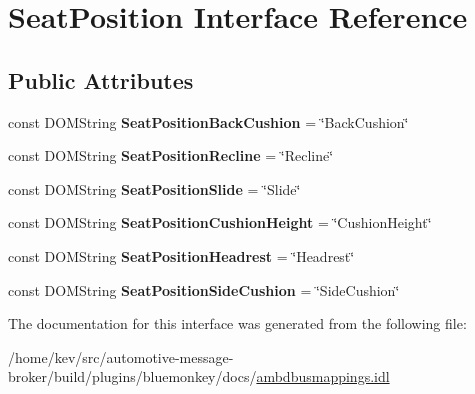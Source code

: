 \hypertarget{interfaceSeatPosition}{\section{Seat\+Position Interface Reference}
\label{interfaceSeatPosition}
}
\subsection*{Public Attributes}
\begin{DoxyCompactItemize}
\item 
\hypertarget{interfaceSeatPosition_ac8bece8802214d0e6818cdd684475c95}{const D\+O\+M\+String {\bfseries Seat\+Position\+Back\+Cushion} = \char`\"{}Back\+Cushion\char`\"{}}\label{interfaceSeatPosition_ac8bece8802214d0e6818cdd684475c95}

\item 
\hypertarget{interfaceSeatPosition_a36cdc356f63c78d136410e988a907ed5}{const D\+O\+M\+String {\bfseries Seat\+Position\+Recline} = \char`\"{}Recline\char`\"{}}\label{interfaceSeatPosition_a36cdc356f63c78d136410e988a907ed5}

\item 
\hypertarget{interfaceSeatPosition_a069910a5ab1f5be6bbc3b029dcdf0eec}{const D\+O\+M\+String {\bfseries Seat\+Position\+Slide} = \char`\"{}Slide\char`\"{}}\label{interfaceSeatPosition_a069910a5ab1f5be6bbc3b029dcdf0eec}

\item 
\hypertarget{interfaceSeatPosition_a71c2aafbae2d66d1a0bbb148c819ca2b}{const D\+O\+M\+String {\bfseries Seat\+Position\+Cushion\+Height} = \char`\"{}Cushion\+Height\char`\"{}}\label{interfaceSeatPosition_a71c2aafbae2d66d1a0bbb148c819ca2b}

\item 
\hypertarget{interfaceSeatPosition_ac8c68e0e481bb1e1d9dfc89256bccfd5}{const D\+O\+M\+String {\bfseries Seat\+Position\+Headrest} = \char`\"{}Headrest\char`\"{}}\label{interfaceSeatPosition_ac8c68e0e481bb1e1d9dfc89256bccfd5}

\item 
\hypertarget{interfaceSeatPosition_a8d99f1b16ca607b77e32f77a3f0c643e}{const D\+O\+M\+String {\bfseries Seat\+Position\+Side\+Cushion} = \char`\"{}Side\+Cushion\char`\"{}}\label{interfaceSeatPosition_a8d99f1b16ca607b77e32f77a3f0c643e}

\end{DoxyCompactItemize}


The documentation for this interface was generated from the following file\+:\begin{DoxyCompactItemize}
\item 
/home/kev/src/automotive-\/message-\/broker/build/plugins/bluemonkey/docs/\hyperlink{ambdbusmappings_8idl}{ambdbusmappings.\+idl}\end{DoxyCompactItemize}
